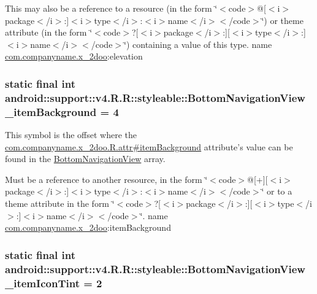 This may also be a reference to a resource (in the form \char`\"{}$<$code$>$@\mbox{[}$<$i$>$package$<$/i$>$:\mbox{]}$<$i$>$type$<$/i$>$:$<$i$>$name$<$/i$>$$<$/code$>$\char`\"{}) or theme attribute (in the form \char`\"{}$<$code$>$?\mbox{[}$<$i$>$package$<$/i$>$:\mbox{]}\mbox{[}$<$i$>$type$<$/i$>$:\mbox{]}$<$i$>$name$<$/i$>$$<$/code$>$\char`\"{}) containing a value of this type.  name \hyperlink{namespacecom_1_1companyname_1_1x__2doo}{com.companyname.x\_\-2doo}:elevation \hypertarget{classandroid_1_1support_1_1v4_1_1_r_1_1styleable_330b02e19c11aae9367f4261f0e3d83e}{
\subsubsection[{BottomNavigationView\_\-itemBackground}]{\setlength{\rightskip}{0pt plus 5cm}static final int android::support::v4.R.R::styleable::BottomNavigationView\_\-itemBackground = 4}}
\label{classandroid_1_1support_1_1v4_1_1_r_1_1styleable_330b02e19c11aae9367f4261f0e3d83e}


This symbol is the offset where the \hyperlink{classcom_1_1companyname_1_1x__2doo_1_1_r_1_1attr_c3fdfd3a1290e179f9d4db208e3c6bc7}{com.companyname.x\_\-2doo.R.attr\#itemBackground} attribute's value can be found in the \hyperlink{classandroid_1_1support_1_1v4_1_1_r_1_1styleable_731fa193e6e8634aff724fecf9d4f640}{BottomNavigationView} array.

Must be a reference to another resource, in the form \char`\"{}$<$code$>$@\mbox{[}+\mbox{]}\mbox{[}$<$i$>$package$<$/i$>$:\mbox{]}$<$i$>$type$<$/i$>$:$<$i$>$name$<$/i$>$$<$/code$>$\char`\"{} or to a theme attribute in the form \char`\"{}$<$code$>$?\mbox{[}$<$i$>$package$<$/i$>$:\mbox{]}\mbox{[}$<$i$>$type$<$/i$>$:\mbox{]}$<$i$>$name$<$/i$>$$<$/code$>$\char`\"{}.  name \hyperlink{namespacecom_1_1companyname_1_1x__2doo}{com.companyname.x\_\-2doo}:itemBackground \hypertarget{classandroid_1_1support_1_1v4_1_1_r_1_1styleable_79d29538f6e5b9f23314f6cfa696688f}{
\subsubsection[{BottomNavigationView\_\-itemIconTint}]{\setlength{\rightskip}{0pt plus 5cm}static final int android::support::v4.R.R::styleable::BottomNavigationView\_\-itemIconTint = 2}}
\label{classandroid_1_1support_1_1v4_1_1_r_1_1styleable_79d29538f6e5b9f23314f6cfa696688f}


